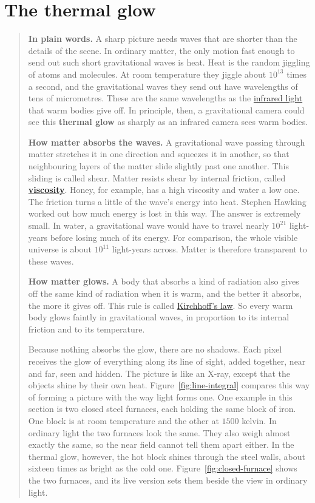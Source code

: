 \section{The thermal glow}\label{sec:thermal}

\begin{quote}
\textbf{In plain words.} A sharp picture needs waves that are shorter than the
details of the scene. In ordinary matter, the only motion fast enough to send
out such short gravitational waves is heat. Heat is the random jiggling of
atoms and molecules. At room temperature they jiggle about $10^{13}$ times a
second, and the gravitational waves they send out have wavelengths of tens of
micrometres. These are the same wavelengths as the
\href{https://en.wikipedia.org/wiki/Infrared}{infrared light} that warm bodies
give off. In principle, then, a gravitational camera could see this
\textbf{thermal glow} as sharply as an infrared camera sees warm bodies.

\textbf{How matter absorbs the waves.} A gravitational wave passing through
matter stretches it in one direction and squeezes it in another, so that
neighbouring layers of the matter slide slightly past one another. This sliding
is called shear. Matter resists shear by internal friction, called
\textbf{\href{https://en.wikipedia.org/wiki/Viscosity}{viscosity}}. Honey, for
example, has a high viscosity and water a low one. The friction turns a little
of the wave's energy into heat. Stephen Hawking worked out how much energy is
lost in this way. The answer is extremely small. In water, a gravitational wave
would have to travel nearly $10^{21}$ light-years before losing much of its
energy. For comparison, the whole visible universe is about $10^{11}$
light-years across. Matter is therefore transparent to these waves.

\textbf{How matter glows.} A body that absorbs a kind of radiation also gives
off the same kind of radiation when it is warm, and the better it absorbs, the
more it gives off. This rule is called
\href{https://en.wikipedia.org/wiki/Kirchhoff's_law_of_thermal_radiation}{Kirchhoff's
law}. So every warm body glows faintly in gravitational waves, in proportion to
its internal friction and to its temperature.

Because nothing absorbs the glow, there are no shadows. Each pixel receives the
glow of everything along its line of sight, added together, near and far,
seen and hidden. The picture is like an X-ray, except that the objects shine by
their own heat. Figure~\ref{fig:line-integral} compares this way of forming a picture with the way light forms one. One example in this section is two closed steel furnaces, each
holding the same block of iron. One block is at room temperature and the other
at $1500$ kelvin. In ordinary light the two furnaces look the same. They also
weigh almost exactly the same, so the near field cannot tell them apart either.
In the thermal glow, however, the hot block shines through the steel walls,
about sixteen times as bright as the cold one. Figure~\ref{fig:closed-furnace} shows the two furnaces, and its live version sets them beside the view in ordinary light.


\end{quote}
